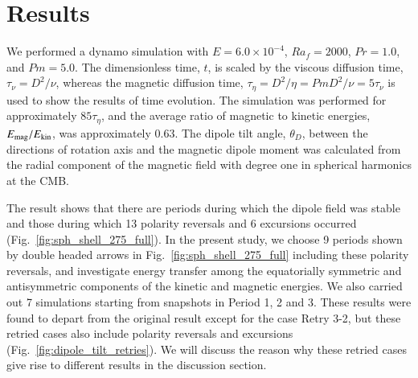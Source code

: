 \section{Results}
\label{section:results}

We performed a dynamo simulation with $E = 6.0 \times 10^{-4}$, $Ra_f = 2000$, $Pr = 1.0$, and $Pm = 5.0$. 
The dimensionless time, $t$, is scaled by the viscous diffusion time, $\tau_\nu = D^2 / \nu$, whereas the magnetic diffusion time, $\tau_\eta = D^2 / \eta = Pm D^2 / \nu = 5 \tau_\nu$ is used to show the results of time evolution. %
The simulation was performed for approximately $85 \tau_\eta$, and the average ratio of magnetic to kinetic energies, $E_{\rm mag} / E_{\rm kin}$, was approximately 0.63. 
The dipole tilt angle, $\theta_D$, between the directions of rotation axis and the magnetic dipole moment was calculated from the radial component of the magnetic field with degree one in spherical harmonics at the CMB.




{\color{red}
The result shows that there are periods during which the dipole field was stable and those during which 13 polarity reversals and 6 excursions occurred (Fig.~\ref{fig:sph_shell_275_full}).
}
In the present study, we choose 9 periods shown by double headed arrows in Fig.~\ref{fig:sph_shell_275_full} including these polarity reversals, and investigate energy transfer among the equatorially symmetric and antisymmetric components of the kinetic and magnetic energies. 
We also carried out 7 simulations starting from snapshots in Period 1, 2 and 3. 
{\color{red}
These results were found to depart from the original result except for the case Retry 3-2, but these retried cases also include polarity reversals and excursions (Fig.~\ref{fig:dipole_tilt_retries}). 
We will discuss the reason why these retried cases give rise to different results in the discussion section.
}

